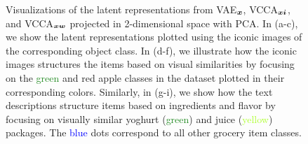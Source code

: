 \begin{figure}[t]
	\centering
	
	\vspace{-2mm}
	\caption{ Visualizations of the latent representations from VAE$_{\bm{x}}$, VCCA$_{{\bm{x}}{\bm{i}}}$, and VCCA$_{{\bm{x}}{\bm{w}}}$ projected in 2-dimensional space with PCA. In (a-c), we show the latent representations plotted using the iconic images of the corresponding object class. In (d-f), we illustrate how the iconic images structures the items based on visual similarities by focusing on the \textcolor{ForestGreen}{green} and \textcolor{RedOrange}{red} apple classes in the dataset plotted in their corresponding colors. Similarly, in (g-i), we show how the text descriptions structure items based on ingredients and flavor by focusing on visually similar yoghurt (\textcolor{ForestGreen}{green}) and juice (\textcolor{GreenYellow}{yellow}) packages. The \textcolor{blue}{blue} dots correspond to all other grocery item classes. } 
	\label{fig:latent_space_visualizations}
	\vspace{-3mm}
\end{figure}




